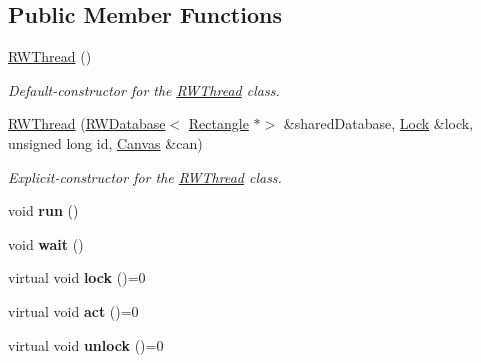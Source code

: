 \subsection*{Public Member Functions}
\begin{DoxyCompactItemize}
\item 
\hyperlink{class_r_w_thread_aa69e6643625bba0aefa86d58cd308827}{R\+W\+Thread} ()
\begin{DoxyCompactList}\small\item\em Default-\/constructor for the \hyperlink{class_r_w_thread}{R\+W\+Thread} class. \end{DoxyCompactList}\item 
\hyperlink{class_r_w_thread_a907cf42de1454ec96ec5620114046f92}{R\+W\+Thread} (\hyperlink{class_r_w_database}{R\+W\+Database}$<$ \hyperlink{classtsgl_1_1_rectangle}{Rectangle} $\ast$$>$ \&shared\+Database, \hyperlink{class_lock}{Lock} \&lock, unsigned long id, \hyperlink{classtsgl_1_1_canvas}{Canvas} \&can)
\begin{DoxyCompactList}\small\item\em Explicit-\/constructor for the \hyperlink{class_r_w_thread}{R\+W\+Thread} class. \end{DoxyCompactList}\item 
\mbox{\label{class_r_w_thread_adfb9ef73b0fc09b07db6682ea1fde721}} 
void {\bfseries run} ()
\item 
\mbox{\label{class_r_w_thread_ac6d96d9953273f79ccaa3ec5fb2ad56b}} 
void {\bfseries wait} ()
\item 
\mbox{\label{class_r_w_thread_a59ec4dac8d85e21715081478303c789e}} 
virtual void {\bfseries lock} ()=0
\item 
\mbox{\label{class_r_w_thread_a5a29f03164040ee9da4591abcd734528}} 
virtual void {\bfseries act} ()=0
\item 
\mbox{\label{class_r_w_thread_af747d0aafadb9648baa9486fb598366c}} 
virtual void {\bfseries unlock} ()=0
\end{DoxyCompactItemize}
